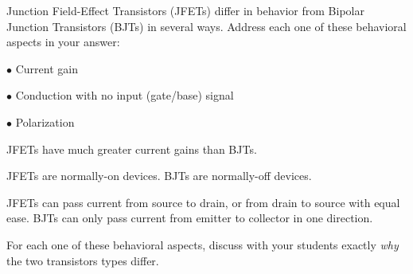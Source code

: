 

Junction Field-Effect Transistors (JFETs) differ in behavior from Bipolar Junction Transistors (BJTs) in several ways.  Address each one of these behavioral aspects in your answer:

\medskip
\goodbreak
\item{$\bullet$} Current gain
\item{$\bullet$} Conduction with no input (gate/base) signal
\item{$\bullet$} Polarization
\medskip







JFETs have much greater current gains than BJTs.

\vskip 10pt

JFETs are normally-on devices.  BJTs are normally-off devices.

\vskip 10pt

JFETs can pass current from source to drain, or from drain to source with equal ease.  BJTs can only pass current from emitter to collector in one direction.







For each one of these behavioral aspects, discuss with your students exactly {\it why} the two transistors types differ.




